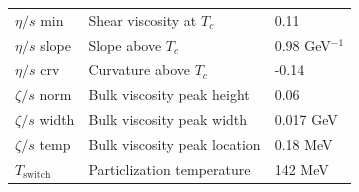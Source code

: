 \documentclass[aspectratio=169]{beamer}
\begin{document}
\begin{frame}[plain]
\begin{columns}
\begin{column}{.6\textwidth}
\begin{table}
\begin{tabular}{lll}
          $\eta/s$ min      & Shear viscosity at $T_c$           & 0.11            \\
          $\eta/s$ slope    & Slope above $T_c$                  & 0.98 GeV$^{-1}$ \\
          $\eta/s$ crv      & Curvature above $T_c$              & -0.14           \\
          $\zeta/s$ norm    & Bulk viscosity peak height         & 0.06            \\
          $\zeta/s$ width   & Bulk viscosity peak width          & 0.017 GeV       \\
          $\zeta/s$ temp    & Bulk viscosity peak location       & 0.18 MeV        \\
          $T_\text{switch}$ & Particlization temperature         & 142 MeV         \\
        \end{tabular}
      \end{table}
    \end{column}
  \end{columns}
\end{frame}

\usebackgroundtemplate{}
\end{document}
